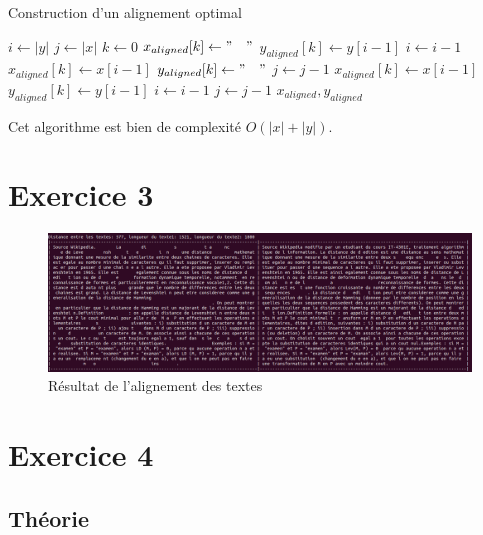 \documentclass{article}
\begin{document}
\begin{algorithm}
\caption{Construction d'un alignement optimal}\label{algo:alignement}
\begin{algorithmic}[1]
	\State $i \gets  \lvert y \rvert $	
	\State $j \gets  \lvert x \rvert $	
	\State $k \gets 0$
			\State $x_{aligned}[k] \gets "\quad"$
			\State $y_{aligned}[k] \gets y[i-1]$
			\State $i \gets i-1$
			\State $x_{aligned}[k] \gets x[i-1]$
			\State $y_{aligned}[k] \gets "\quad"$
			\State $j \gets j-1$
			\State $x_{aligned}[k] \gets x[i-1]$
			\State $y_{aligned}[k] \gets y[i-1]$
			\State $i \gets i-1$
			\State $j \gets j-1$
		\EndIf
	\EndWhile	
	\State\Return $x_{aligned}, y_{aligned}$
\EndProcedure
\end{algorithmic}
\end{algorithm}


Cet algorithme est bien de complexité $O(\lvert x\rvert+\lvert y\rvert)$.

\section{Exercice 3}

\begin{figure}[!hbt]
	\centering
	\includegraphics[width=0.95\linewidth]{./images/exo3.png}
	\caption{Résultat de l'alignement des textes}%
	\label{fig:exo3}
\end{figure}
\section{Exercice 4}
\subsection{Théorie}
\end{document}
